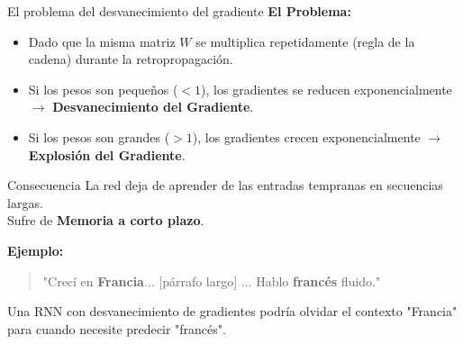 \documentclass[aspectratio=169]{beamer}
\begin{document}
	
	
	
	
	\begin{frame}{El problema del desvanecimiento del gradiente}
		\textbf{El Problema:}
		\begin{itemize}
			\item Dado que la misma matriz $W$ se multiplica repetidamente (regla de la cadena) durante la retropropagación.
			\item Si los pesos son pequeños ($<1$), los gradientes se reducen exponencialmente $\rightarrow$ \textbf{Desvanecimiento del Gradiente}.
			\item Si los pesos son grandes ($>1$), los gradientes crecen exponencialmente $\rightarrow$ \textbf{Explosión del Gradiente}.
		\end{itemize}
		\begin{alertblock}{Consecuencia}
			La red deja de aprender de las entradas tempranas en secuencias largas. \\ Sufre de \textbf{Memoria a corto plazo}.
		\end{alertblock}
		\textbf{Ejemplo:}
		\begin{quote}
			"Crecí en \textbf{Francia}... [párrafo largo] ... Hablo \textbf{francés} fluido."
		\end{quote}
		
		Una RNN con desvanecimiento de gradientes podría olvidar el contexto "Francia" para cuando necesite predecir "francés".
	\end{frame}
	
\end{document}
